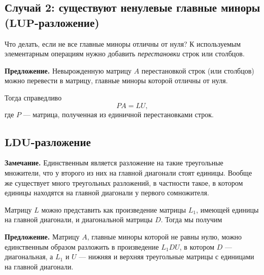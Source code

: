 \documentclass[11pt,a4paper]{article}
\begin{document}
    \hypertarget{ux441ux43bux443ux447ux430ux439-2-ux441ux443ux449ux435ux441ux442ux432ux443ux44eux442-ux43dux435ux43dux443ux43bux435ux432ux44bux435-ux433ux43bux430ux432ux43dux44bux435-ux43cux438ux43dux43eux440ux44b-mathbflup-ux440ux430ux437ux43bux43eux436ux435ux43dux438ux435}{%
\subsection{\texorpdfstring{Случай 2: существуют ненулевые главные
миноры
(\(\mathbf{LUP}\)-разложение)}{Случай 2: существуют ненулевые главные миноры (\textbackslash mathbf\{LUP\}-разложение)}}\label{ux441ux43bux443ux447ux430ux439-2-ux441ux443ux449ux435ux441ux442ux432ux443ux44eux442-ux43dux435ux43dux443ux43bux435ux432ux44bux435-ux433ux43bux430ux432ux43dux44bux435-ux43cux438ux43dux43eux440ux44b-mathbflup-ux440ux430ux437ux43bux43eux436ux435ux43dux438ux435}}

Что делать, если не все главные миноры отличны от нуля? К используемым
элементарным операциям нужно добавить \emph{перестановки} строк или
столбцов.

\textbf{Предложение.} Невырожденную матрицу \(A\) перестановкой строк
(или столбцов) можно перевести в матрицу, главные миноры которой отличны
от нуля.

Тогда справедливо \[ PA = LU,\] где \(P\) --- матрица, полученная из
единичной перестановками строк.

    \hypertarget{mathbfldu-ux440ux430ux437ux43bux43eux436ux435ux43dux438ux435}{%
\subsection{\texorpdfstring{\(\mathbf{LDU}\)-разложение}{\textbackslash mathbf\{LDU\}-разложение}}\label{mathbfldu-ux440ux430ux437ux43bux43eux436ux435ux43dux438ux435}}

\textbf{Замечание.} Единственным является разложение на такие
треугольные множители, что у второго из них на главной диагонали стоят
единицы. Вообще же существует много треугольных разложений, в частности
такое, в котором единицы находятся на главной диагонали у первого
сомножителя.

Матрицу \(L\) можно представить как произведение матрицы \(L_1\),
имеющей единицы на главной диагонали, и диагональной матрицы \(D\).
Тогда мы получим

\textbf{Предложение.} Матрицу \(A\), главные миноры которой не равны
нулю, можно единственным образом разложить в произведение \(L_1 D U\), в
котором \(D\) --- диагональная, а \(L_1\) и \(U\) --- нижняя и верхняя
треугольные матрицы с единицами на главной диагонали.
\end{document}
